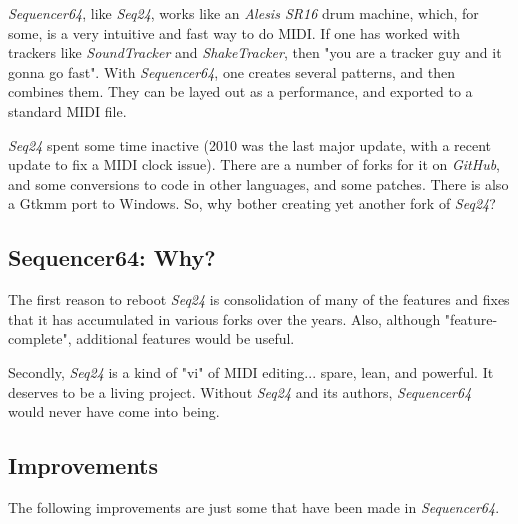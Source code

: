 \documentclass[
 11pt,
 twoside,
 a4paper,
 headinclude,
 footinclude,
 final                                 %
]{article}
\begin{document}
   \textsl{Sequencer64}, like \textsl{Seq24},
   works like an \textsl{Alesis SR16} drum machine,
   which, for some, is a very intuitive and fast way to do MIDI.
   If one has worked with trackers like \textsl{SoundTracker} and
   \textsl{ShakeTracker}, then "you are a tracker guy and it gonna go fast".
   With \textsl{Sequencer64}, one creates several patterns, and then
   combines them.  They can be layed out as a performance,
   and exported to a standard MIDI file.

   \textsl{Seq24} spent some time inactive
   (2010 was the last major update, with a
   recent update to fix a MIDI clock issue).  There are a number of
   forks for it on \textsl{GitHub}, and some conversions
   to code in other languages, and some patches.
   There is also a Gtkmm port to Windows.
   So, why bother creating yet another fork of \textsl{Seq24}?

\subsection{Sequencer64: Why?}
\label{subsec:introduction_seq64_vs_others}

   The first reason to reboot \textsl{Seq24} is consolidation of many of the
   features and fixes that it has accumulated in various forks over the years.
   Also, although "feature-complete", additional features would be useful.

   Secondly, \textsl{Seq24} is a kind of "vi" of MIDI editing... spare,
   lean, and powerful.  It deserves to be a living project.  Without
   \textsl{Seq24} and its authors, \textsl{Sequencer64} would never have come
   into being.

\subsection{Improvements}
\label{subsec:improvements}

   The following improvements are just some that have been made in
   \textsl{Sequencer64}.
\end{document}
